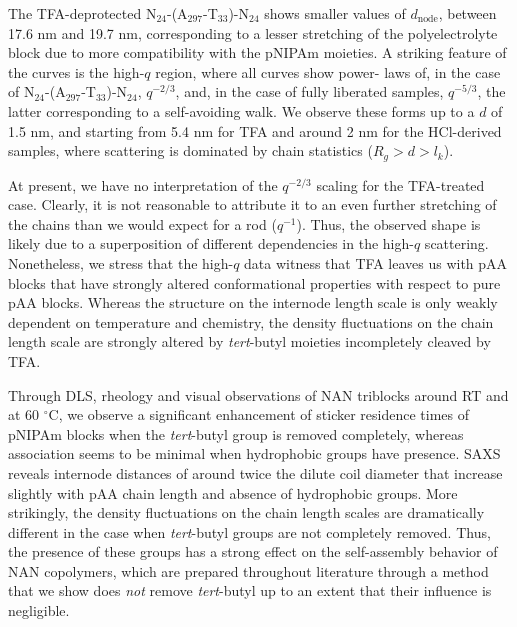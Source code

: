 \documentclass{article}
\begin{document}
The TFA-deprotected N$_\mathrm{24}$-(A$_\mathrm{297}$-T$_\mathrm{33}$)-N$_\mathrm{24}$ 
shows smaller values of $d_\mathrm{node}$, between 17.6 nm and 19.7 nm, corresponding to a lesser
stretching of the polyelectrolyte block due to more compatibility with the pNIPAm 
moieties. A striking feature of the curves is the high-$q$ region, where all curves show power-
laws of, in the case of
N$_\mathrm{24}$-(A$_\mathrm{297}$-T$_\mathrm{33}$)-N$_\mathrm{24}$, $q^{-2/3}$, and, 
in the case of fully liberated samples, $q^{-5/3}$, the latter 
corresponding to a self-avoiding walk.\cite{DeGennes1979} We observe these forms up to a 
$d$ of 1.5 nm, and starting from 5.4 nm for TFA and around 2 nm 
for the HCl-derived samples, where scattering is dominated by chain statistics ($R_{g}>d>l_k$). 

At present, we have no interpretation of the $q^{-2/3}$ scaling for the TFA-treated case. Clearly,
it is not reasonable to attribute it to an even further stretching of the chains than we would
expect for a rod ($q^{-1}$). Thus, the observed shape is likely due to a superposition of different
dependencies in the high-$q$ scattering. Nonetheless, 
we stress that the high-$q$ data witness that TFA leaves us with 
pAA blocks that have strongly altered conformational
properties with respect to pure pAA blocks.
Whereas the structure on the internode length scale is only weakly dependent on 
temperature and chemistry,
the density fluctuations on the chain length scale are strongly altered by \emph{tert}-butyl 
moieties incompletely cleaved by TFA.

Through DLS, rheology and visual observations of NAN triblocks around RT and at
60 $^\circ\mathrm{C}$, we observe a significant enhancement of sticker residence times 
of pNIPAm blocks 
when the \emph{tert}-butyl group is removed completely, whereas association seems to be minimal
when hydrophobic groups have presence. SAXS reveals internode distances of around twice the
dilute coil diameter that increase slightly with pAA chain length and absence of 
hydrophobic groups. More strikingly,
the density fluctuations on the chain length scales are dramatically different in the 
case when \emph{tert}-butyl groups are
not completely removed. Thus, the presence of these groups has a strong effect on the 
self-assembly behavior of NAN copolymers, 
which are prepared throughout literature through a method that we show does \emph{not} 
remove \emph{tert}-butyl up to an 
extent that their influence is negligible.
\end{document}
